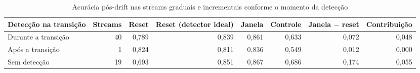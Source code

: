 \begin{table}[htbp]
\centering
\small
\caption{Acurácia pós-drift nas streams graduais e incrementais conforme o momento da detecção}
\label{tab:reset-lentas}
\begin{adjustbox}{max width=\textwidth}
\begin{tabular}{lrrrrrrr}
\toprule
Detecção na transição & Streams & Reset & Reset (detector ideal) & Janela & Controle & Janela $-$ reset & Contribuição \\
\midrule
Durante a transição & 40 & 0,789 & 0,839 & 0,861 & 0,633 & 0,072 & 0,048 \\
Após a transição & 1 & 0,824 & 0,811 & 0,836 & 0,549 & 0,012 & 0,000 \\
Sem detecção & 19 & 0,693 & 0,851 & 0,867 & 0,686 & 0,174 & 0,055 \\
\bottomrule
\end{tabular}
\end{adjustbox}
\par\vspace{2pt}{\footnotesize Médias dos três classificadores. Contribuição: parcela da diferença total entre janela e reset (0,103) que vem de cada grupo de streams.}
\end{table}
